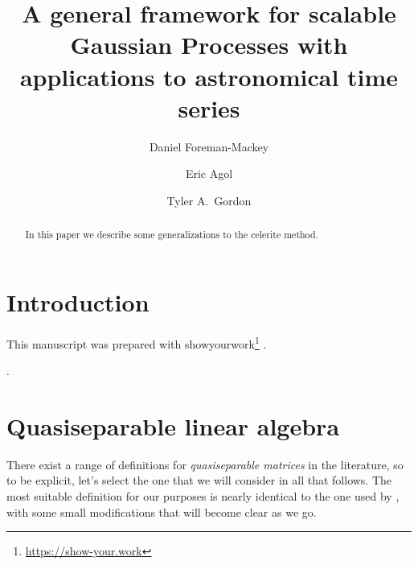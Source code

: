 \documentclass[modern]{aastex631}
\newcommand{\project}[1]{\textsf{#1}}
\begin{document}
\title{A general framework for scalable Gaussian Processes with applications to astronomical time series}

\author[0000-0002-9328-5652]{Daniel Foreman-Mackey}

\author[0000-0002-0802-9145]{Eric Agol}

\author[0000-0001-5253-1987]{Tyler A.\ Gordon}

\begin{abstract}
    In this paper we describe some generalizations to the \project{celerite} method.
\end{abstract}


\section{Introduction}
\label{sec:intro}

This manuscript was prepared with \project{showyourwork}\footnote{\url{https://show-your.work}} \citep{Luger:2021}.

\citep{Foreman-Mackey:2017, Foreman-Mackey:2018, Foreman-Mackey:2021}.

\section{Quasiseparable linear algebra}

There exist a range of definitions for \emph{quasiseparable matrices} in the literature, so to be explicit, let's select the one that we will consider in all that follows.
The most suitable definition for our purposes is nearly identical to the one used by \citet{Eidelman:1999}, with some small modifications that will become clear as we go.
\end{document}
